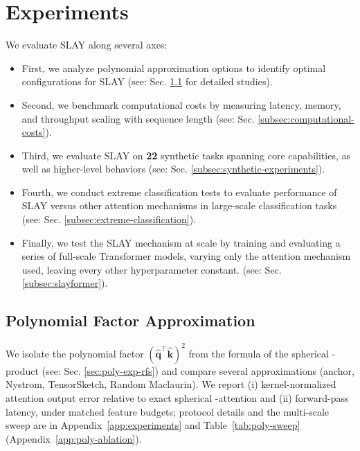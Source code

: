 \documentclass{article}
\DeclareRobustCommand{\E}{\text{\normalfont\tifinaghfont ⵟ}}
\begin{document}
\section{Experiments}
\label{sec:experiments}
We evaluate SLAY along several axes:
\vspace{-3mm}
\begin{itemize}
\item First, we analyze polynomial approximation options to identify optimal configurations for SLAY (see: Sec. \ref{subsec:poly-ablation} for detailed studies).
\vspace{-2mm}
\item Second, we benchmark computational costs by measuring latency, memory, and throughput scaling with sequence length (see: Sec. \ref{subsec:computational-costs}).
\vspace{-2mm}
\item  Third, we evaluate SLAY on \textbf{22} synthetic tasks spanning core capabilities, as well as higher-level behaviors (see: Sec. \ref{subsec:synthetic-experiments}). 
\vspace{-2mm}
\item Fourth, we conduct extreme classification tests to evaluate performance of SLAY versus other attention mechanisms in large-scale classification tasks (see: Sec. \ref{subsec:extreme-classification}). 
\vspace{-2mm}
\item Finally, we test the SLAY mechanism at scale by training and evaluating a series of full-scale Transformer models, varying only the attention mechanism used, leaving every other hyperparameter constant. (see: Sec. \ref{subsec:slayformer}).
\end{itemize}
\vspace{-3mm}
\subsection{Polynomial Factor Approximation}
\label{subsec:poly-ablation}
We isolate the polynomial factor $(\widehat{\mathbf{q}}^\top \widehat{\mathbf{k}})^2$ from the formula of the spherical \E-product (see: Sec. \ref{sec:poly-exp-rfs}) and compare several approximations (anchor, Nystrom, TensorSketch, Random Maclaurin). We report (i) kernel-normalized attention output error relative to exact spherical \E-attention and (ii) forward-pass latency, under matched feature budgets; protocol details and the multi-scale sweep are in Appendix~\ref{app:experiments} and Table~\ref{tab:poly-sweep} (Appendix~\ref{app:poly-ablation}).
\end{document}
